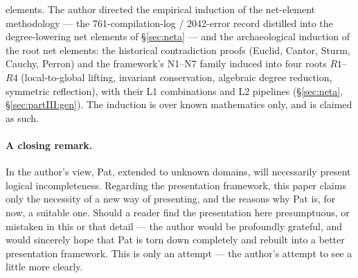 \documentclass{article}
\begin{document}
\begin{enumerate}
{elements.} The author directed the empirical induction of the
net-element methodology --- the 761-compilation-log / 2042-error
record distilled into the degree-lowering net elements of
\S\ref{sec:neta} --- and the archaeological induction of the root net
elements: the historical contradiction proofs (Euclid, Cantor,
Sturm, Cauchy, Perron) and the framework's N1--N7 family induced into
four roots $R1$--$R4$ (local-to-global lifting, invariant
conservation, algebraic degree reduction, symmetric reflection), with
their L1 combinations and L2 pipelines
(\S\ref{sec:neta}, \S\ref{sec:partIII:gen}). The induction is over
known mathematics only, and is claimed as such.
\end{enumerate}

\paragraph{A closing remark.}
In the author's view, Pat, extended to unknown domains, will
necessarily present logical incompleteness. Regarding the
presentation framework, this paper claims only the necessity of a
new way of presenting, and the reasons why Pat is, for now, a
suitable one. Should a reader find the presentation here
presumptuous, or mistaken in this or that detail --- the author
would be profoundly grateful, and would sincerely hope that Pat is
torn down completely and rebuilt into a better presentation
framework. This is only an attempt --- the author's attempt to see
a little more clearly.
\end{document}
